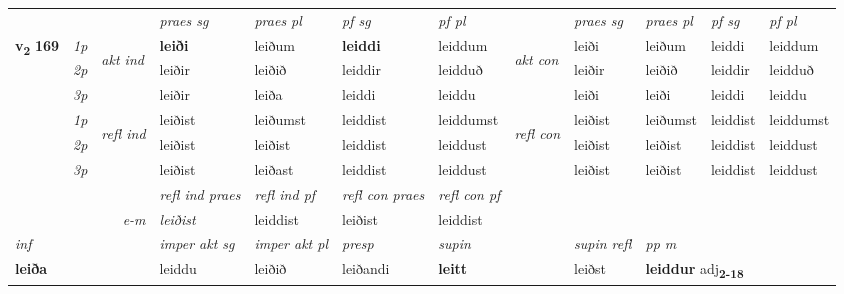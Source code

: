 \begin{longtable}[l]{X>{\footnotesize\itshape}llXXXXlXXXX}
\midrule

 & &   & \textit{praes sg}  & \textit{praes pl}    & \textit{ pf sg} & \textit{pf pl} & & \textit{praes sg}  & \textit{praes pl}    & \textit{pf sg} & \textit{pf pl }  \\ \cmidrule{4-7} \cmidrule{9-12}
 \multirow{2}{*}{{{\textbf{v{\textsubscript{2}}} \Large{\textbf{169}}}}}  & 1p & \multirow{3}{*}{\begin{turn}{90}\textit{akt ind}\end{turn}} & \textbf{leiði} & leiðum & \textbf{leiddi} & leiddum & \multirow{3}{*}{\begin{turn}{90}\textit{akt con}\end{turn}} &leiði & leiðum & leiddi & leiddum\\*
 & 2p &  &  leiðir  & leiðið & leiddir & leidduð & & leiðir & leiðið & leiddir & leidduð \\*
 & 3p &  & leiðir & leiða & leiddi & leiddu & & leiði & leiði& leiddi & leiddu \\*
\cmidrule{4-7} \cmidrule{9-12}
 & 1p & \multirow{3}{*}{\begin{turn}{90}\textit{refl ind}\end{turn}}  & leiðist & leiðumst & leiddist & leiddumst & \multirow{3}{*}{\begin{turn}{90}\textit{refl con}\end{turn}}  &leiðist & leiðumst & leiddist & leiddumst \\*
 & 2p &  & leiðist & leiðist & leiddist & leiddust & &leiðist & leiðist & leiddist & leiddust \\*
 & 3p  & & leiðist & leiðast & leiddist & leiddust & & leiðist & leiðist& leiddist & leiddust \\*
\cmidrule{4-7} \cmidrule{9-12}

 & && \textit{refl ind praes} & \textit{refl ind pf} & \textit{refl con praes} & \textit{refl con pf} \\*
\multicolumn{3}{r}{\textit{e-m}}& leiðist & leiddist & leiðist & leiddist \\*

\cmidrule{4-7}
   {\textit{inf}} & &  & \textit{imper akt sg} & \textit{imper akt pl}   & \textit{presp} & \textit{supin} && \textit{supin refl} & \textit{pp m} \\*
  {\textbf{leiða}} & && leiddu  & leiðið   & leiðandi &  \textbf{leitt} && leiðst & \multicolumn{2}{l}{\textbf{leiddur} adj\textbf{\textsubscript{2-18}}} \\*

\midrule


\end{longtable}
